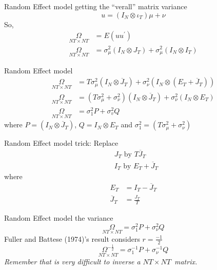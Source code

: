 \begin{frame}{Random Effect model}
	getting the ``verall'' matrix variance%
		$$u=\left( I_{N}\otimes \iota _{T}\right) \mu +\nu$$
	So,
		\begin{align*}
			\underset{NT\times NT}{\Omega } & = E(uu^{\prime }) \\
			\underset{NT\times NT}{\Omega } & = \sigma _{\mu }^{2}\left( I_{N}\otimes
												J_{T}\right) +\sigma _{\mu }^{2}\left(
												I_{N}\otimes I_{T}\right)
		\end{align*}
\end{frame}
\begin{frame}{Random Effect model}
		\begin{align*}
			\underset{NT\times NT}{\Omega } & = T\sigma _{\mu }^{2}\left( I_{N}\otimes 
												\overline{J}_{T}\right) +\sigma _{\nu }^{2}\left( I_{N}\otimes \left( E_{T}+%
												\overline{J}_{T}\right) \right) \\
			\underset{NT\times NT}{\Omega } & = \left( T\sigma _{\mu }^{2}+\sigma _{\nu
												}^{2}\right) \left( I_{N}\otimes \overline{J}_{T}\right) +\sigma _{\nu
												}^{2}\left( I_{N}\otimes E_{T}\right) \\
			\underset{NT\times NT}{\Omega } & = \sigma _{1}^{2}P+\sigma _{v}^{2}Q
		\end{align*}
	where $P=\left( I_{N}\otimes \overline{J}_{T}\right) $, $Q=I_{N}\otimes E_{T} $ and $\sigma _{1}^{2}=\left( T\sigma _{\mu }^{2}+\sigma _{\nu}^{2}\right)$
\end{frame}
\begin{frame}{Random Effect model}
	trick: Replace
		\begin{align*}
			& J_{T}\text{ by }T\overline{J}_{T} \\
			& I_{T}\text{ by }E_{T}+\overline{J}_{T}
		\end{align*}%
	where
		\begin{align*}
					   E_{T} & = I_{T}-\overline{J}_{T} \\
			\overline{J}_{T} & = \frac{J_{T}}{T}
		\end{align*}
\end{frame}
\begin{frame}{Random Effect model}
	the variance
		$$\underset{NT\times NT}{\Omega }=\sigma _{1}^{2}P+\sigma _{\nu }^{2}Q$$
	Fuller and Battese (1974)'s result considers $r=\frac{-1}{2}$
		$$\underset{NT\times NT}{\Omega ^{-\frac{1}{2}}}=\sigma _{1}^{-1}P+\sigma_{\nu }^{-1}Q$$
	\emph{Remember that is very difficult to inverse a }$NT\times NT$\emph{\ matrix.}
\end{frame}
